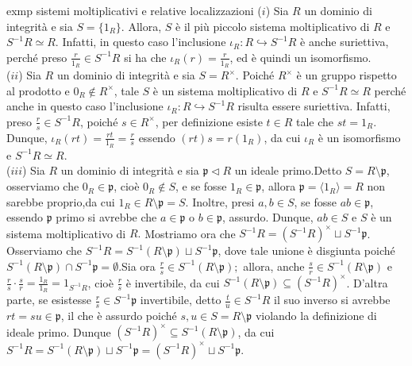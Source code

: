 \begin{example}{exmp sistemi moltiplicativi e relative localizzazioni}
  ($i$) Sia $R$ un dominio di integrità e sia $S=\{1_R\}$. Allora, $S$ è il più piccolo sistema moltiplicativo di 
  $R$ e $S^{-1}R\simeq R$. Infatti, in questo caso l'inclusione $\iota_R\colon R\hookrightarrow S^{-1}R$ è anche suriettiva, 
  perché preso $\frac{r}{1_R}\in S^{-1}R$ si ha che $\iota_R(r)=\frac{r}{1_R}$, ed è quindi un isomorfismo. \\

  \noindent ($ii$) Sia $R$ un dominio di integrità e sia $S=R^{\times}$. Poiché $R^{\times}$ è un gruppo rispetto al prodotto e 
  $0_R\not\in R^{\times}$, tale $S$ è un sistema moltiplicativo di $R$ e $S^{-1}R\simeq R$ perché anche in questo caso l'inclusione 
  $\iota_R\colon R\hookrightarrow S^{-1}R$ risulta essere suriettiva. Infatti, preso $\frac{r}{s}\in S^{-1}R$, 
  poiché $s\in R^{\times}$, per definizione esiste $t\in R$ tale che $st=1_R$. Dunque, $\iota_R(rt)=\frac{rt}{1_R}=\frac{r}{s}$ essendo 
  $(rt)s=r(1_R)$, da cui $\iota_R$ è un isomorfismo e $S^{-1}R\simeq R$. \\
  
  \noindent ($iii$) Sia $R$ un dominio di integrità e sia $\mathfrak{p}\lhd R$ un ideale primo.\footnotemark Detto $S=R\setminus \mathfrak{p}$, 
  osserviamo che $0_R\in \mathfrak{p}$, cioè $0_R\not\in S$, e se fosse $1_R \in\mathfrak{p}$, 
  allora $\mathfrak{p}=\langle 1_R\rangle =R$ non sarebbe proprio,\footnotemark da cui $1_R\in R\setminus \mathfrak{p}=S$. 
  Inoltre, presi $a,b\in S$, se fosse $ab\in \mathfrak{p}$, essendo $\mathfrak{p}$ primo si avrebbe che $a\in \mathfrak{p}$ o $b\in\mathfrak{p}$, assurdo. 
  Dunque, $ab\in S$ e $S$ è un sistema moltiplicativo di $R.$ Mostriamo ora che $S^{-1}R=(S^{-1}R)^{\times}\sqcup S^{-1}\mathfrak{p}$. 
  Osserviamo che $S^{-1}R=S^{-1}(R\setminus \mathfrak{p}) \sqcup S^{-1}\mathfrak{p}$, dove tale unione è disgiunta poiché 
  $S^{-1}(R\setminus \mathfrak{p}) \cap S^{-1}\mathfrak{p}=\emptyset$.\footnotemark Sia ora $\frac{r}{s}\in S^{-1}(R\setminus\mathfrak{p});$ allora, anche 
  $\frac{s}{r}\in S^{-1}(R\setminus\mathfrak{p})$ e $\frac{r}{s}\cdot \frac{s}{r}=\frac{1_R}{1_R}=1_{S^{-1}R}$, cioè $\frac{r}{s}$ è invertibile, 
  da cui $S^{-1}(R\setminus\mathfrak{p})\subseteq (S^{-1}R)^{\times}$. D'altra parte, se esistesse $\frac{r}{s}\in S^{-1}\mathfrak{p}$ invertibile,
  detto $\frac{t}{u}\in S^{-1}R$ il suo inverso si avrebbe $rt=su\in \mathfrak{p}$, il che è assurdo poiché $s,u \in S=R\setminus \mathfrak{p}$ 
  violando la definizione di ideale primo. Dunque $(S^{-1}R)^{\times}\subseteq S^{-1}(R\setminus\mathfrak{p})$, 
  da cui $S^{-1}R=S^{-1}(R\setminus \mathfrak{p}) \sqcup S^{-1}\mathfrak{p}=(S^{-1}R)^{\times}\sqcup S^{-1}\mathfrak{p}$.
\end{example}

